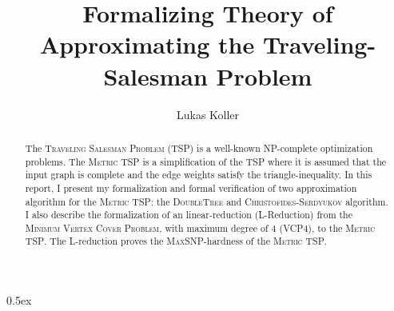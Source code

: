 \documentclass[11pt,a4paper]{article}
\begin{document}
\title{Formalizing Theory of Approximating the Traveling-Salesman Problem}
\author{Lukas Koller}
\maketitle

\begin{abstract}
  The \textsc{Traveling Salesman Problem} (\textsc{TSP}) is a well-known \textsc{NP}-complete optimization problems. The \textsc{Metric TSP} is a simplification of the \textsc{TSP} where it is assumed that the input graph is complete and the edge weights satisfy the triangle-inequality. In this report, I present my formalization and formal verification of two approximation algorithm for the \textsc{Metric TSP}: the \textsc{DoubleTree} and \textsc{Christofides-Serdyukov} algorithm. I also describe the formalization of an linear-reduction (L-Reduction) from the \textsc{Minimum Vertex Cover Problem}, with maximum degree of 4 (\textsc{VCP4}), to the \textsc{Metric TSP}. The L-reduction proves the \textsc{MaxSNP}-hardness of the \textsc{Metric TSP}. 
\end{abstract}

\tableofcontents

\parindent 0pt\parskip 0.5ex





\end{document}
